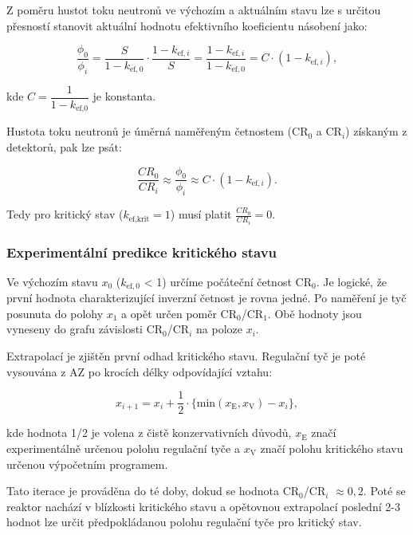 Z poměru hustot toku neutronů ve výchozím a aktuálním stavu lze s určitou přesností stanovit aktuální hodnotu efektivního koeficientu násobení jako:

\begin{equation*}
    \frac{\phi_0}{\phi_i} = \frac{S}{1 - k_{\text{ef},0}} \cdot \frac{1 - k_{\text{ef},i}}{S} = \frac{1 - k_{\text{ef},i}}{1 - k_{\text{ef},0}}= C \cdot (1-k_{\text{ef},i}),
\end{equation*}

kde $C=\dfrac{1}{1-k_\text{ef,0}}$ je konstanta.

Hustota toku neutronů je úměrná naměřeným četnostem (CR$_0$ a CR$_i$) získaným z detektorů, pak lze psát:

\begin{equation*}
    \frac{CR_0}{CR_i} \approx \frac{\phi_0}{\phi_i} \approx C \cdot (1-k_{\text{ef},i}).
\end{equation*}

Tedy pro kritický stav ($k_{\text{ef},\text{krit}} = 1$) musí platit $\frac{CR_0}{CR_i} = 0$.

\subsubsection{Experimentální predikce kritického stavu}

Ve výchozím stavu $x_0$ ($k_{\text{ef},0}$ < 1) určíme počáteční četnost CR$_0$. Je logické, že první hodnota charakterizující inverzní četnost je rovna jedné. Po naměření je tyč posunuta do polohy $x_1$ a opět určen poměr CR$_0$/CR$_1$. Obě hodnoty jsou vyneseny do grafu závislosti CR$_0$/CR$_i$ na poloze $x_i$.

Extrapolací je zjištěn první odhad kritického stavu. Regulační tyč je poté vysouvána z AZ po krocích délky odpovídající vztahu:

\begin{equation}
    x_{i+1} =x_i+\frac{1}{2} \cdot \{\text{min}(x_\text{E},x_\text{V}) - x_i\},
\end{equation}

kde hodnota 1/2 je volena z čistě konzervativních důvodů, $x_\text{E}$ značí experimentálně určenou polohu regulační tyče a $x_\text{V}$ značí polohu kritického stavu určenou výpočetním programem.

Tato iterace je prováděna do té doby, dokud se hodnota CR$_0$/CR$_i$ $\approx 0,2$. Poté se reaktor nachází v blízkosti kritického stavu a opětovnou extrapolací poslední 2-3 hodnot lze určit předpokládanou polohu regulační tyče pro kritický stav.

